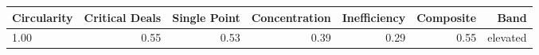 

\begin{tabular}{@{}lrrrrrr@{}}
\toprule
Circularity & Critical Deals & Single Point & Concentration & Inefficiency & Composite & Band \\
\midrule
1.00 & 0.55 & 0.53 & 0.39 & 0.29 & 0.55 & elevated \\
\bottomrule
\end{tabular}